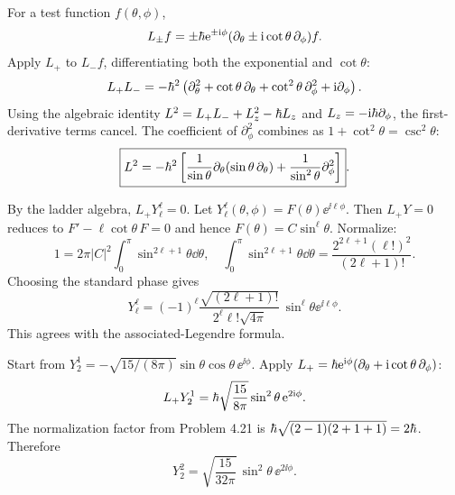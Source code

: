 For a test function $f(\theta,\phi)$,
\begin{equation}
L_\pm f=\pm\hbar\mathrm e^{\pm\mathrm i\phi}
(\partial_\theta\pm\mathrm i\cot\theta\,\partial_\phi)f.
\end{equation}
Apply $L_+$ to $L_-f$, differentiating
both the exponential and $\cot\theta$:
\begin{equation}
L_+L_-=-\hbar^2\left(
\partial_\theta^2+\cot\theta\,\partial_\theta+
\cot^2\theta\,\partial_\phi^2+
\mathrm i\partial_\phi\right).
\end{equation}
Using the algebraic identity
$L^2=L_+L_-+L_z^2-\hbar L_z$
and $L_z=-\mathrm i\hbar\partial_\phi$,
the first-derivative terms cancel.
The coefficient of $\partial_\phi^2$
combines as $1+\cot^2\theta=\csc^2\theta$:
\begin{equation}
\boxed{L^2=-\hbar^2
\left[\frac1{\sin\theta}\partial_\theta
(\sin\theta\,\partial_\theta)+
\frac1{\sin^2\theta}\partial_\phi^2\right]}.
\end{equation}

By the ladder algebra,
$\boxed{L_+Y_\ell^\ell=0}$.
Let $Y_\ell^\ell(\theta,\phi)=
F(\theta)\ee^{\ii\ell\phi}$.
Then $L_+Y=0$ reduces to
$F'-\ell\cot\theta\,F=0$ and hence
$F(\theta)=C\sin^\ell\theta$.
Normalize:
\begin{equation}
1=2\pi|C|^2\int_0^\pi
\sin^{2\ell+1}\theta\dd\theta,\quad
\int_0^\pi\sin^{2\ell+1}\theta\dd\theta
=\frac{2^{2\ell+1}(\ell!)^2}{(2\ell+1)!}.
\end{equation}
Choosing the standard phase gives
\begin{equation}
\boxed{Y_\ell^\ell=
(-1)^\ell\frac{\sqrt{(2\ell+1)!}}
{2^\ell\ell!\sqrt{4\pi}}\,
\sin^\ell\theta\ee^{\ii\ell\phi}}.
\end{equation}
This agrees with the associated-Legendre formula.

Start from
$Y_2^1=-\sqrt{15/(8\pi)}
\sin\theta\cos\theta\,\ee^{\ii\phi}$.
Apply
$L_+=\hbar\mathrm e^{\mathrm i\phi}
(\partial_\theta+\mathrm i\cot\theta\,\partial_\phi)$:
\begin{equation}
L_+Y_2^1=
\hbar\sqrt{\frac{15}{8\pi}}
\sin^2\theta\,\mathrm e^{2\mathrm i\phi}.
\end{equation}
The normalization factor from Problem 4.21
is $\hbar\sqrt{(2-1)(2+1+1)}=2\hbar$.
Therefore
\begin{equation}
\boxed{Y_2^2=
\sqrt{\frac{15}{32\pi}}\,
\sin^2\theta\,\ee^{2\ii\phi}}.
\end{equation}

